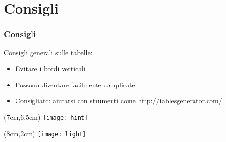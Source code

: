 \section{Consigli}
\begin{frame}
 
 \frametitle{Consigli}
 
 Consigli generali sulle tabelle:
 \begin{itemize}
  \item Evitare i bordi verticali
  \item Possono diventare facilmente complicate
  \item Consigliato: aiutarsi con strumenti come 
\url{http://tablesgenerator.com/}
 \end{itemize}

 \begin{textblock*}{5cm}(7cm,6.5cm)
   \texttt{[image: hint]}
  \end{textblock*}
  
  
 \begin{textblock*}{5cm}(8cm,2cm)
   \texttt{[image: light]}
  \end{textblock*}
\end{frame}
